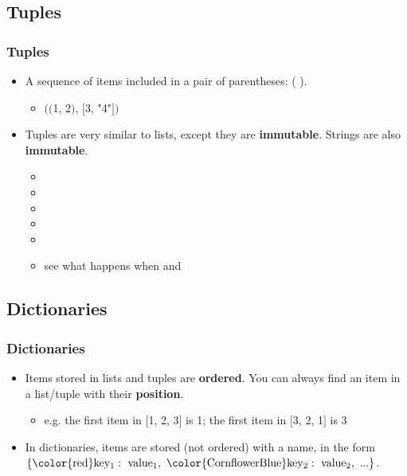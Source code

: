 \documentclass[xcolor={usenames, dvipsnames}, hyperref={colorlinks,linkcolor=black, urlcolor=blue}]{beamer}
\begin{document}

\subsection{Tuples}

\begin{frame}
\frametitle{Tuples}

\begin{itemize}
\item A sequence of items included in a pair of parentheses: ( ).
	\begin{itemize}
	\item $($$($1, 2$)$, $[$3, "4"$]$$)$
	\end{itemize}
\end{itemize}

\begin{itemize}
\item Tuples are very similar to lists, except they are \textbf{immutable}. Strings are also \textbf{immutable}.
	\begin{itemize}
	\item {}
	\item {}
	\item {}
	\item {}
	\item {}
	\item see what happens when  and 
	\end{itemize}
\end{itemize}

\end{frame}


\subsection{Dictionaries} 
\begin{frame}
\frametitle{Dictionaries}

\begin{itemize}
\item Items stored in lists and tuples are \textbf{ordered}. You can always find an item in a list/tuple with their \textbf{position}.
	\begin{itemize}
	\item e.g. the first item in $[$1, 2, 3$]$ is 1; the first item in $[$3, 2, 1$]$ is 3
	\end{itemize}
\end{itemize}

\begin{itemize}
\item In dictionaries, items are stored (not ordered) with a name, in the form $\rm \left\{{\color{red}key_1:\ value_1}, \ {\color{CornflowerBlue}key_2:\ value_2},\ ...\right\}$. 
\end{itemize}

\end{frame}
\end{document}
